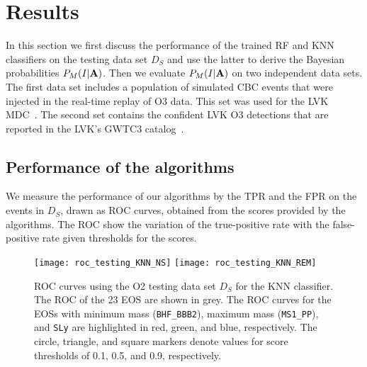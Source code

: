 \section{Results} \label{results}

In this section we first discuss the performance of the trained \ac{RF} and \ac{KNN} classifiers on the testing data set $D_S$ and use the latter to derive the Bayesian probabilities $P_M(I|{\bf
A})$. Then we evaluate $P_M(I|{\bf A})$ on two independent data sets. The first data set includes a population of simulated \ac{CBC} events that were injected in the real-time replay of \ac{O3} data. This set was used for the \ac{LVK} \ac{MDC}~\cite{Chaudhary:2023vec}. The second set contains the confident \ac{LVK} \ac{O3} detections that are reported in the \ac{LVK}'s \ac{GWTC3}
catalog~\cite{LIGOScientific:2021djp}.

\subsection{Performance of the algorithms}

We measure the performance of our algorithms by the \ac{TPR} and the \ac{FPR} on the events in $D_S$, drawn as \ac{ROC} curves, obtained from the scores provided by the algorithms. The \ac{ROC} show the variation of the true-positive rate with the false-positive rate given thresholds for the scores.  

\begin{figure}[h]
\texttt{[image: roc\_testing\_KNN\_NS]}
\texttt{[image: roc\_testing\_KNN\_REM]}
\caption{\ac{ROC} curves using the O2 testing data set $D_S$ for the \ac{KNN} classifier. The \ac{ROC} of the 23 \ac{EOS} are shown in grey. The \ac{ROC} curves for the \ac{EOS}s with minimum mass ({\tt BHF\_BBB2}), maximum mass ({\tt MS1\_PP}), and {\tt SLy} are highlighted in red, green, and blue, respectively. The circle, triangle, and square markers denote values for score thresholds of 0.1, 0.5, and 0.9, respectively.}
\label{fig:rocO2_KNN}
\end{figure}

